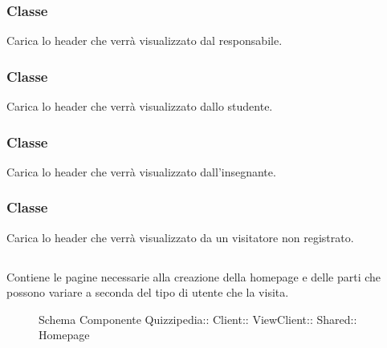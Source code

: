 \subsubsection{Classe }
Carica lo header che verrà visualizzato dal responsabile.
\begin{itemize}
\end{itemize}
\subsubsection{Classe }
Carica lo header che verrà visualizzato dallo studente.
\begin{itemize}
\end{itemize}
\subsubsection{Classe }
Carica lo header che verrà visualizzato dall'insegnante.
\begin{itemize}
\end{itemize}
\subsubsection{Classe }
Carica lo header che verrà visualizzato da un visitatore non registrato.
\begin{itemize}
\end{itemize}
\subsection{}
Contiene le pagine necessarie alla creazione della homepage e delle parti che possono variare a seconda del tipo di utente che la visita.
\begin{figure}[H]
\centering
\noindent{}
\caption[Schema Componente Homepage]{Schema Componente Quizzipedia:: Client:: ViewClient:: Shared:: Homepage}
\end{figure}

